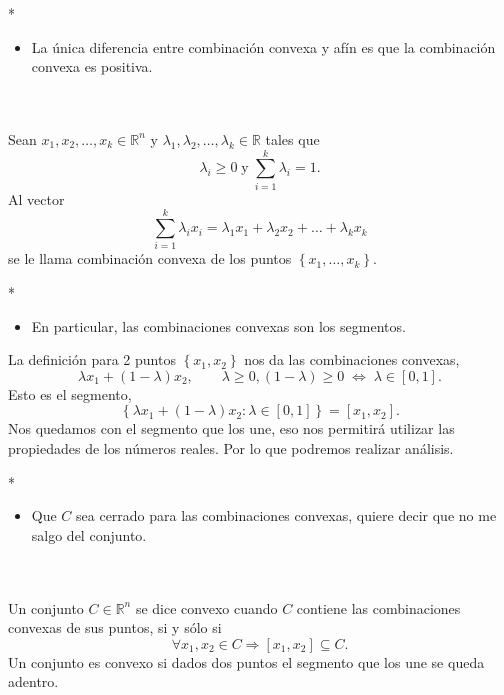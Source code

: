 \begin{paracol}{2}
\switchcolumn[1]*{\noindent\scriptsize
\begin{itemize}
    \item La única diferencia entre combinación convexa y afín es que la combinación convexa es positiva.
\end{itemize}
}
\switchcolumn[0]\noindent
\begin{def.}\,\\\\
    Sean $x_1,x_2,\ldots,x_k\in \mathbb{R}^n$ y $\lambda_1,\lambda_2,\ldots,\lambda_k\in \mathbb{R}$ tales que 
    $$\lambda_i\geq 0\; \text{y} \;\displaystyle\sum_{i=1}^{k}\lambda_i=1.$$ 
    Al vector
    $$\sum_{i=1}^{k}\lambda_ix_i=\lambda_1x_1+\lambda_2x_2+\ldots+\lambda_kx_k$$
    se le llama combinación convexa de los puntos $\left\{x_1,\ldots,x_k\right\}$.
\end{def.}

\switchcolumn[1]*{\noindent\scriptsize
\begin{itemize}
    \item En particular, las combinaciones convexas son los segmentos.
\end{itemize}
}
\switchcolumn[0]\noindent
\begin{obs}
    La definición para 2 puntos $\left\{x_1,x_2\right\}$ nos da las combinaciones convexas,
    $$\lambda x_1+(1-\lambda)x_2,\qquad \lambda\geq 0, (1-\lambda)\geq 0 \; \Leftrightarrow \; \lambda \in \left[0,1\right].$$
    Esto es el segmento,
    $$\left\{\lambda x_1+(1-\lambda)x_2: \lambda\in \left[0,1\right]\right\}=\left[x_1,x_2\right].$$
    Nos quedamos con el segmento que los une, eso nos permitirá utilizar las propiedades de los números reales. Por lo que podremos realizar análisis.
\end{obs}

\switchcolumn[1]*{\noindent\scriptsize
\begin{itemize}
    \item Que $C$ sea cerrado para las combinaciones convexas, quiere decir que no me salgo del conjunto.
\end{itemize}
}
\switchcolumn[0]\noindent
\begin{def.}[Convexo]\,\\\\
    Un conjunto $C\in \mathbb{R}^n$ se dice convexo cuando $C$ contiene las combinaciones convexas de sus puntos, si y sólo si
    $$\forall x_1,x_2\in C \Rightarrow \left[x_1,x_2\right]\subseteq C.$$
    Un conjunto es convexo si dados dos puntos el segmento que los une se queda adentro.
\end{def.}


\end{paracol}
